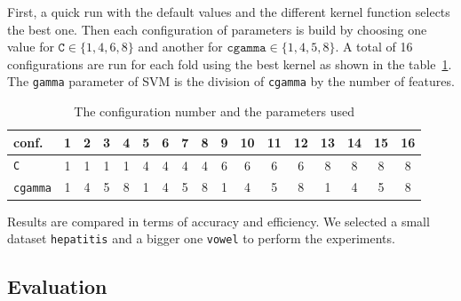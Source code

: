 \documentclass[a4paper]{article}
\begin{document}
First, a quick run with the default values and the different kernel function 
selects the best one. Then each configuration of parameters is build by choosing 
one value for $\texttt{C} \in \{1,4,6,8\}$ and another for $\texttt{cgamma} \in 
\{1,4,5,8\}$. A total of 16 configurations are run for each fold using the best 
kernel as shown in the table~\ref{tab:conf}. The \texttt{gamma} parameter of SVM 
is the division of \texttt{cgamma} by the number of features.
%
\begin{table}[h]
\small
\centering
\begin{tabular}{lcccccccccccccccc}
\toprule
conf. & 1 & 2 & 3 & 4 & 5 & 6 & 7 & 8 & 9 &10 &11 &12 &13 &14 &15 &16 \\
\midrule
\texttt{C} & 1 & 1 & 1 & 1 & 4 & 4 & 4 & 4 & 6 & 6 & 6 & 6 & 8 & 8 & 8 & 8 \\
\texttt{cgamma} & 1 & 4 & 5 & 8 & 1 & 4 & 5 & 8 & 1 & 4 & 5 & 8 & 1 & 4 & 5 & 8 
\\
\bottomrule
\end{tabular}
\caption{The configuration number and the parameters used}
\label{tab:conf}
\end{table}
%
%
%

Results are compared in terms of accuracy and efficiency. We selected a small 
dataset \texttt{hepatitis} and a bigger one \texttt{vowel} to perform the 
experiments.


%
%
%

\subsection{Evaluation}
%
%
%
%
%
\end{document}
